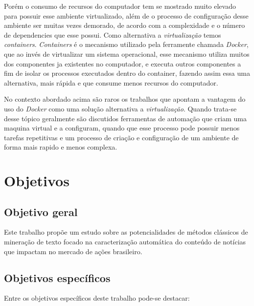 \documentclass[11pt,a4paper]{article}
\begin{document}
Porém o consumo de recursos do computador tem se mostrado muito elevado para possuir esse ambiente virtualizado,
além de o processo de configuração desse ambiente ser muitas vezes demorado, de acordo com a complexidade e
o número de dependencies que esse possui. Como alternativa a \textit{virtualização} temos \textit{containers}.
\textit{Containers} é o mecanismo utilizado pela ferramente chamada \textit{Docker}, que ao invés de virtualizar
um sistema operacional, esse mecanismo utiliza muitos dos componentes ja existentes no computador, e executa
outros componentes a fim de isolar os processos executados dentro do container\cite{TW_docker_for_builds}, fazendo assim essa uma alternativa,
mais rápida e que consume menos recursos do computador.

No contexto abordado acima são raros os trabalhos que apontam a vantagem do uso do \textit{Docker} como uma solução
alternativa a \textit{virtualização}\cite{Jafari_infra_as_a_code}. Quando trata-se desse tópico geralmente são discutidos ferramentas de automação
que criam uma maquina virtual e a configuram, quando que esse processo pode possuir menos tarefas repetitivas e um
processo de criação e configuração de um ambiente de forma mais rapido e menos complexa.

\section{Objetivos}\label{sec:objetivos}

\subsection{Objetivo geral}

Este trabalho propõe um estudo sobre as potencialidades de métodos clássicos de mineração de texto focado na caracterização
automática do conteúdo de notícias que impactam no mercado de ações brasileiro.

\subsection{Objetivos específicos}

Entre os objetivos específicos deste trabalho pode-se destacar:
\end{document}
